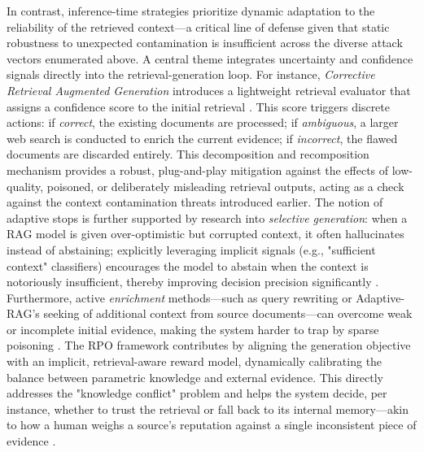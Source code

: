 \documentclass[11pt,a4paper]{article}
\begin{document}
In contrast, inference-time strategies prioritize dynamic adaptation to the reliability of the retrieved context---a critical line of defense given that static robustness to unexpected contamination is insufficient across the diverse attack vectors enumerated above. A central theme integrates uncertainty and confidence signals directly into the retrieval-generation loop. For instance, \emph{Corrective Retrieval Augmented Generation} introduces a lightweight retrieval evaluator that assigns a confidence score to the initial retrieval \cite{arxiv:2401.15884v2}. This score triggers discrete actions: if \emph{correct}, the existing documents are processed; if \emph{ambiguous}, a larger web search is conducted to enrich the current evidence; if \emph{incorrect}, the flawed documents are discarded entirely. This decomposition and recomposition mechanism provides a robust, plug-and-play mitigation against the effects of low-quality, poisoned, or deliberately misleading retrieval outputs, acting as a check against the context contamination threats introduced earlier. The notion of adaptive stops is further supported by research into \emph{selective generation}: when a RAG model is given over-optimistic but corrupted context, it often hallucinates instead of abstaining; explicitly leveraging implicit signals (e.g., "sufficient context" classifiers) encourages the model to abstain when the context is notoriously insufficient, thereby improving decision precision significantly \cite{arxiv:2306.06812v1}. Furthermore, active \emph{enrichment} methods---such as query rewriting or Adaptive-RAG's seeking of additional context from source documents---can overcome weak or incomplete initial evidence, making the system harder to trap by sparse poisoning \cite{arxiv:2411.07396v1}. The RPO framework contributes by aligning the generation objective with an implicit, retrieval-aware reward model, dynamically calibrating the balance between parametric knowledge and external evidence. This directly addresses the "knowledge conflict" problem and helps the system decide, per instance, whether to trust the retrieval or fall back to its internal memory---akin to how a human weighs a source's reputation against a single inconsistent piece of evidence \cite{arxiv:2505.14146v2}.
\end{document}
